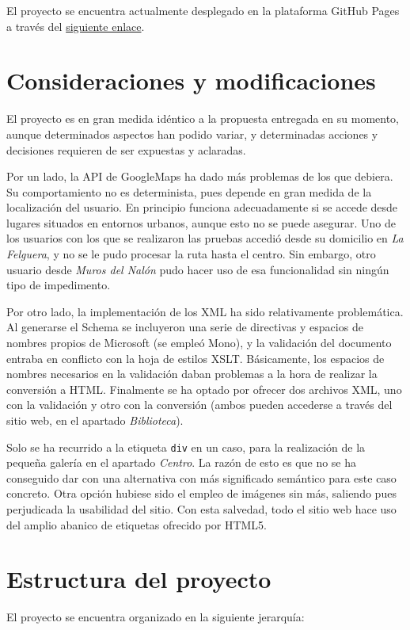 \documentclass[11pt]{article}
\begin{document}
        El proyecto se encuentra actualmente desplegado en la plataforma GitHub Pages a través del \href{https://flecktarn121.github.io/sew/extraordinary}{siguiente enlace}.

        \section{Consideraciones y modificaciones}
        El proyecto es en gran medida idéntico a la propuesta entregada en su momento, aunque determinados aspectos han podido variar, y determinadas acciones y decisiones requieren de ser expuestas y aclaradas.

        Por un lado, la API de GoogleMaps ha dado más problemas de los que debiera.
        Su comportamiento no es determinista, pues depende en gran medida de la localización del usuario.
        En principio funciona adecuadamente si se accede desde lugares situados en entornos urbanos, aunque esto no se puede asegurar.
        Uno de los usuarios con los que se realizaron las pruebas accedió desde su domicilio en \textit{La Felguera}, y no se le pudo procesar la ruta hasta el centro.
        Sin embargo, otro usuario desde \textit{Muros del Nalón} pudo hacer uso de esa funcionalidad sin ningún tipo de impedimento.

        Por otro lado, la implementación de los XML ha sido relativamente problemática.
        Al generarse el Schema se incluyeron una serie de directivas y espacios de nombres propios de Microsoft (se empleó Mono), y la validación del documento entraba en conflicto con la hoja de estilos XSLT.
        Básicamente, los espacios de nombres necesarios en la validación daban problemas a la hora de realizar la conversión a HTML.
        Finalmente se ha optado por ofrecer dos archivos XML, uno con la validación y otro con la conversión (ambos pueden accederse a través del sitio web, en el apartado \textit{Biblioteca}).

        Solo se ha recurrido a la etiqueta \texttt{div} en un caso, para la realización de la pequeña galería en el apartado \textit{Centro}.
        La razón de esto es que no se ha conseguido dar con una alternativa con más significado semántico para este caso concreto.
        Otra opción hubiese sido el empleo de imágenes sin más, saliendo pues perjudicada la usabilidad del sitio.
        Con esta salvedad, todo el sitio web hace uso del amplio abanico de etiquetas ofrecido por HTML5.

        \section{Estructura del proyecto}
        El proyecto se encuentra organizado en la siguiente jerarquía:
\end{document}
